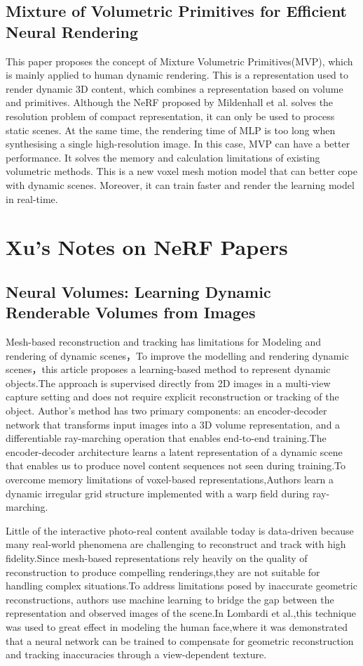 \documentclass[UTF-8]{ctexart}
\begin{document}
\subsection{Mixture of Volumetric Primitives for Efficient Neural Rendering}
This paper proposes the concept of Mixture Volumetric Primitives(MVP), which is mainly applied to human dynamic rendering. This is a representation used to render dynamic 3D content, which combines a representation based on volume and primitives. Although the NeRF proposed by Mildenhall et al. solves the resolution problem of compact representation, it can only be used to process static scenes. At the same time, the rendering time of MLP is too long when synthesising a single high-resolution image. In this case, MVP can have a better performance. It solves the memory and calculation limitations of existing volumetric methods. This is a new voxel mesh motion model that can better cope with dynamic scenes. Moreover, it can train faster and render the learning model in real-time.

\section{Xu's Notes on NeRF Papers}
\subsection{Neural Volumes: Learning Dynamic Renderable Volumes from Images}
Mesh-based reconstruction and tracking has limitations for Modeling and rendering of dynamic scenes，To improve the modelling and rendering dynamic scenes，this article proposes a learning-based method to represent dynamic objects.The approach is supervised directly from 2D images in a multi-view capture setting and does not require explicit reconstruction or tracking of the object. Author's method has two primary components: an encoder-decoder network that transforms input images into a 3D volume representation, and a differentiable ray-marching operation that enables end-to-end training.The encoder-decoder architecture learns a latent representation of a dynamic scene that enables us to produce novel content sequences not seen during training.To overcome memory limitations of voxel-based representations,Authors learn a dynamic irregular grid structure implemented with a warp field during ray-marching.

Little of the interactive photo-real content available today is data-driven because many real-world phenomena are challenging to reconstruct and track with high fidelity.Since mesh-based representations rely heavily on the quality of reconstruction to produce compelling renderings,they are not suitable for handling complex situations.To address limitations posed by inaccurate geometric reconstructions, authors use machine learning to bridge the gap between the representation and observed images of the scene.In Lombardi et al.,this technique was used to great effect in modeling the human face,where it was demonstrated that a neural network can be trained to compensate for geometric reconstruction and tracking inaccuracies through a view-dependent texture.
\end{document}

